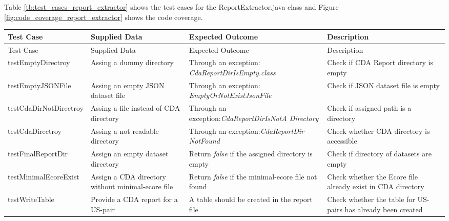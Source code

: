 Table \ref{tb:test_cases_report_extractor} shows the test cases for the ReportExtractor.java class and Figure \ref{fig:code_coverage_report_extractor} shows the code coverage.

	\thispagestyle{empty}
		\begingroup
		\centering
		\scriptsize
		\renewcommand{\arraystretch}{1,5} 
		\keepXColumns
		\begin{tabularx}{\textwidth}{X  X  X  X}		
			\hline
			Test Case &Supplied Data&Expected Outcome&Description\\
			\hline\hline
			\endfirsthead
			\hline
			Test Case &Supplied Data&Expected Outcome&Description\\
			\hline\hline
			\endhead
			testEmptyDirectroy&Assing a dummy directory&Through an exception: \textit{CdaReportDirIsEmpty.class}&Check if CDA Report directory is empty\\
			
			testEmptyJSONFile&Assing an empty JSON dataset file&Through an exception: \textit{EmptyOrNotExistJsonFile}&Check if JSON dataset file is empty\\
			
			testCdaDirNotDirectroy&Assing a file instead of CDA directory&Through an exception:\textit{CdaReportDirIsNotA Directory}&Check if assigned path is a directory\\
			
			testCdaDirectroy&Assing a not readable directory&Through an exception:\textit{CdaReportDir NotFound}&Check whether CDA directory is accessible\\
			
			testFinalReportDir&Assign an empty dataset directory&Return \textit{false} if the assigned directory is empty&Check if directory of datasets are empty\\
			
			testMinimalEcoreExist&Assign a CDA directory without minimal-ecore file&Return \textit{false} if the minimal-ecore file not found&Check whether the Ecore file already exist in CDA directory\\
			
			testWriteTable&Provide a CDA report for a US-pair&A table should be created in the report file&Check whether the table for US-pairs has already been created\\
			

\end{tabularx}
